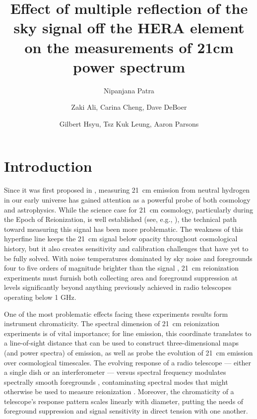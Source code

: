 \documentclass[12pt,preprint]{aastex}
\begin{document}
\title{Effect of multiple reflection of the sky signal off the HERA element on the measurements of 21cm power spectrum} 

\author{Nipanjana Patra }


\author{Zaki Ali, Carina Cheng, Dave DeBoer}
\author{Gilbert Hsyu, Tsz Kuk Leung, Aaron Parsons}


\begin{abstract}
\end{abstract}


\section{Introduction}

Since it was first proposed in \citet{shaver_et_al1999}, measuring 21~cm
emission from neutral hydrogen in our early universe has gained attention as a
powerful probe of both cosmology and astrophysics.  While the science case for
21~cm cosmology, particularly during the Epoch of Reionization, is well
established (see, e.g.,
\citealt{furlanetto_et_al2006,morales_wyithe2010,furlanetto_loeb2014,pritchard_loeb2014}),
the technical path toward measuring this signal has been more problematic.  The
weakness of this hyperfine line keeps the 21~cm signal below opacity throughout
cosmological history, but it also creates sensitivity and calibration
challenges that have yet to be fully solved.  With noise temperatures dominated
by sky noise \citep{XXX} and foregrounds four to five orders of magnitude
brighter than the signal \citep{XXX}, 21~cm reionization experiments must
furnish both collecting area and foreground suppression at levels significantly
beyond anything previously achieved in radio telescopes operating below 1 GHz.

One of the most problematic effects facing these experiments results form instrument
chromaticity.  The spectral dimension of 21~cm reionization experiments is of vital
importance; for line emission, this coordinate translates to a line-of-sight distance
that can be used to construct three-dimensional maps (and power spectra) of emission,
as well as probe the evolution of 21~cm emission over cosmological timescales.
The evolving response of a radio telescope --- either a single dish
or an interferometer --- versus spectral frequency modulates spectrally smooth foregrounds ,
contaminating spectral modes that might
otherwise be used to measure reionization \citep{XXX}.  Moreover, the chromaticity of
a telescope's response pattern scales linearly with diameter, putting the
needs of foreground suppression and signal sensitivity in direct tension with one
another.
\end{document}
